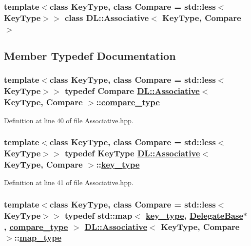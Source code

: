 \subsubsection*{template$<$class Key\-Type, class Compare = std::less$<$Key\-Type$>$$>$ class DL::Associative$<$ Key\-Type, Compare $>$}



\subsection{Member Typedef Documentation}
\hypertarget{classDL_1_1Associative_w0}{
\subsubsection[compare\_\-type]{\setlength{\rightskip}{0pt plus 5cm}template$<$class Key\-Type, class Compare = std::less$<$Key\-Type$>$$>$ typedef Compare \hyperlink{classDL_1_1Associative}{DL::Associative}$<$ Key\-Type, Compare $>$::\hyperlink{classDL_1_1Associative_w0}{compare\_\-type}}}
\label{classDL_1_1Associative_w0}




Definition at line 40 of file Associative.hpp.\hypertarget{classDL_1_1Associative_w1}{
\subsubsection[key\_\-type]{\setlength{\rightskip}{0pt plus 5cm}template$<$class Key\-Type, class Compare = std::less$<$Key\-Type$>$$>$ typedef Key\-Type \hyperlink{classDL_1_1Associative}{DL::Associative}$<$ Key\-Type, Compare $>$::\hyperlink{classDL_1_1Associative_w1}{key\_\-type}}}
\label{classDL_1_1Associative_w1}




Definition at line 41 of file Associative.hpp.\hypertarget{classDL_1_1Associative_w2}{
\subsubsection[map\_\-type]{\setlength{\rightskip}{0pt plus 5cm}template$<$class Key\-Type, class Compare = std::less$<$Key\-Type$>$$>$ typedef std::map$<$ \hyperlink{classDL_1_1Associative_w1}{key\_\-type}, \hyperlink{classDL_1_1DelegateBase}{Delegate\-Base}$\ast$ , \hyperlink{classDL_1_1Associative_w0}{compare\_\-type} $>$ \hyperlink{classDL_1_1Associative}{DL::Associative}$<$ Key\-Type, Compare $>$::\hyperlink{classDL_1_1Associative_w2}{map\_\-type}}}
\label{classDL_1_1Associative_w2}




